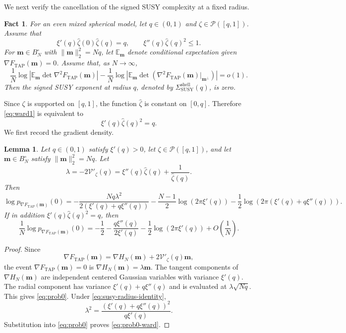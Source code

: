 \documentclass[a4paper,10pt,reqno]{amsart}
\numberwithin{equation}{section}
\newtheorem{lemma}[proposition]{Lemma}%
\newtheorem{fact}[proposition]{Fact}%
\newcommand{\dE}{\mathbb{E}}%
\newcommand{\mc}{\mathcal}
\newcommand{\TAP}{\mathrm{TAP}}
\newcommand{\bfm}{\mathbf{m}}
\newcommand{\zhat}{\widehat\zeta}
\begin{document}
	We next verify the cancellation of the signed SUSY complexity at a fixed
	radius.
	
	\begin{fact}
		For an even mixed spherical model, let \(q\in(0,1)\) and
		\(\zeta\in\mc P([q,1])\). Assume that
		\[
		\xi'(q)\zhat(0)\zhat(q)=q,
		\qquad
		\xi''(q)\zhat(q)^2\le1.
		\]
		For \(\bfm\in B_N^\circ\) with \(\|\bfm\|_2^2=Nq\), let
		\(\dE_\bfm\) denote conditional expectation given
		\(\nabla F_{\TAP}(\bfm)=0\). Assume that, as \(N\to\infty\),
		\[
		\frac1N\log\left|
		\dE_\bfm\det\nabla^2F_{\TAP}(\bfm)
		\right|
		-
		\frac1N\log\left|
		\dE_\bfm\det\left(
		\nabla^2F_{\TAP}(\bfm)|_{\bfm^\perp}
		\right)
		\right|
		=o(1).
		\]
		Then the signed SUSY exponent at radius \(q\), denoted by
		\(\Sigma_{\mathrm{SUSY}}^{\mathrm{shell}}(q)\), is zero.
	\end{fact}
	
	Since \(\zeta\) is supported on \([q,1]\), the function \(\zhat\) is
	constant on \([0,q]\). Therefore \eqref{eq:ward1} is equivalent to
	\begin{equation}\label{eq:susy-radius-identity}
		\xi'(q)\zhat(q)^2=q.
	\end{equation}
	We first record the gradient density.
	\begin{lemma}
		Let \(q\in(0,1)\) satisfy \(\xi'(q)>0\), let
		\(\zeta\in\mc P([q,1])\), and let \(\bfm\in B_N^\circ\) satisfy
		\(\|\bfm\|_2^2=Nq\). Let
		\[
		\lambda=-2\mathcal V'_\zeta(q)
		=\xi''(q)\zhat(q)+\frac1{\zhat(q)}.
		\]
		Then
		\begin{equation}\label{eq:prob0}
			\log p_{\nabla F_{\TAP}(\bfm)}(0)
			=-\frac{Nq\lambda^2}{2(\xi'(q)+q\xi''(q))}
			-\frac{N-1}{2}\log(2\pi\xi'(q))
			-\frac12\log(2\pi(\xi'(q)+q\xi''(q))).
		\end{equation}
		If in addition \(\xi'(q)\zhat(q)^2=q\), then
		\begin{equation}\label{eq:prob0-ward}
			\frac1N\log p_{\nabla F_{\TAP}(\bfm)}(0)
			=-\frac12
			-\frac{q\xi''(q)}{2\xi'(q)}
			-\frac12\log(2\pi\xi'(q))
			+O\left(\frac1N\right).
		\end{equation}
	\end{lemma}
	
	\begin{proof}
		Since
		\[
		\nabla F_{\TAP}(\bfm)
		=\nabla H_N(\bfm)+2\mathcal V'_\zeta(q)\bfm,
		\]
		the event \(\nabla F_{\TAP}(\bfm)=0\) is
		\(\nabla H_N(\bfm)=\lambda\bfm\). The tangent components of
		\(\nabla H_N(\bfm)\) are independent centered Gaussian variables with
		variance \(\xi'(q)\). The radial component has variance
		\(\xi'(q)+q\xi''(q)\) and is evaluated at \(\lambda\sqrt{Nq}\).
		This gives \eqref{eq:prob0}. Under \eqref{eq:susy-radius-identity},
		\[
		\lambda^2
		=\frac{(\xi'(q)+q\xi''(q))^2}{q\xi'(q)}.
		\]
		Substitution into \eqref{eq:prob0} proves \eqref{eq:prob0-ward}.
	\end{proof}
	
\end{document}
